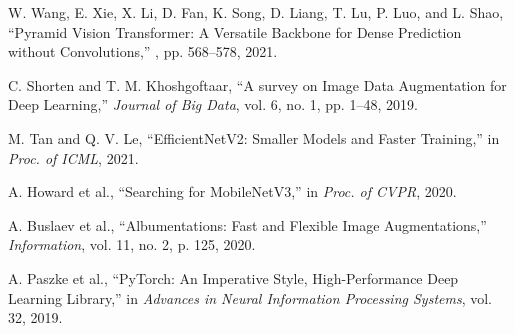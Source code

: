 \documentclass[preprint,12pt]{elsarticle}
\begin{document}
\begin{thebibliography}{99}
W. Wang, E. Xie, X. Li, D. Fan, K. Song, D. Liang, T. Lu, P. Luo, and L. Shao,
\newblock ``Pyramid Vision Transformer: A Versatile Backbone for Dense Prediction without Convolutions,''
, pp. 568--578, 2021.

C. Shorten and T. M. Khoshgoftaar,
``A survey on Image Data Augmentation for Deep Learning,''
\emph{Journal of Big Data}, vol. 6, no. 1, pp. 1–48, 2019.

M. Tan and Q. V. Le,
``EfficientNetV2: Smaller Models and Faster Training,''
in \emph{Proc. of ICML}, 2021.

A. Howard et al.,
``Searching for MobileNetV3,''
in \emph{Proc. of CVPR}, 2020.

A. Buslaev et al.,
``Albumentations: Fast and Flexible Image Augmentations,''
\emph{Information}, vol. 11, no. 2, p. 125, 2020.

A. Paszke et al.,
``PyTorch: An Imperative Style, High-Performance Deep Learning Library,''
in \emph{Advances in Neural Information Processing Systems}, vol. 32, 2019.

\end{thebibliography}
\end{document}
